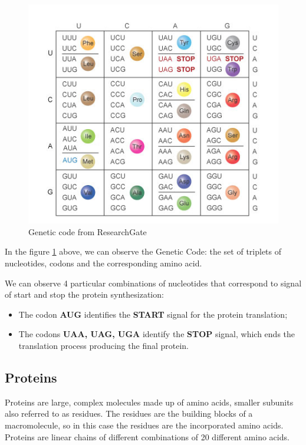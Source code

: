 \begin{figure}[h!]
	\includegraphics[scale=1.3]{res/proteins_overview/genetic_code.png}
	\centering
	\caption{Genetic code from ResearchGate \cite{geneticcode}}
	\label{fig:genetic-code}
\end{figure}

In the figure \ref{fig:genetic-code} above, we can observe the Genetic Code: the set of triplets of nucleotides, codons and the corresponding amino acid.

We can observe 4 particular combinations of nucleotides that correspond to signal of start and stop the protein synthesization:
\begin{itemize}
	\item The codon \textbf{AUG} identifies the \textbf{START} signal for the protein translation;
	\item The codons \textbf{UAA, UAG, UGA} identify the \textbf{STOP} signal, which ends the translation process producing the final protein.
\end{itemize}
\vspace{5em}
\subsection{Proteins}
Proteins are large, complex molecules made up of amino acids, smaller subunits also referred to as residues. The residues are the building blocks of a macromolecule, so in this case the residues are the incorporated amino acids.
Proteins are linear chains of different combinations of 20 different amino acids. 


